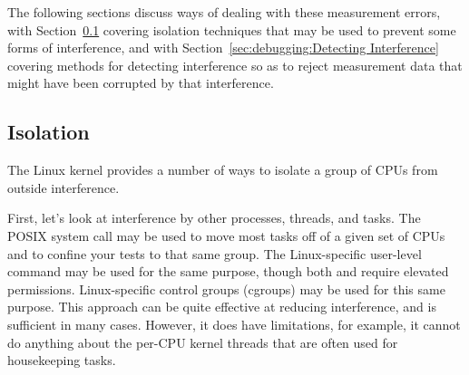 \QuickQuizEnd

The following sections discuss ways of dealing with these measurement
errors, with
Section~\ref{sec:debugging:Isolation}
covering isolation techniques that may be used to prevent some forms of
interference,
and with
Section~\ref{sec:debugging:Detecting Interference}
covering methods for detecting interference so as to reject measurement
data that might have been corrupted by that interference.

\subsection{Isolation}
\label{sec:debugging:Isolation}

The Linux kernel provides a number of ways to isolate a group of
CPUs from outside interference.

First, let's look at interference by other processes, threads, and tasks.
The POSIX  system call may be used to move
most tasks off of a given set of CPUs and to confine your tests to
that same group.
The Linux-specific user-level  command may be used for
the same purpose, though both  and
 require elevated permissions.
Linux-specific control groups (cgroups) may be used for this same purpose.
This approach can be quite effective at reducing interference, and
is sufficient in many cases.
However, it does have limitations, for example, it cannot do anything
about the per-CPU kernel threads that are often used for housekeeping
tasks.

